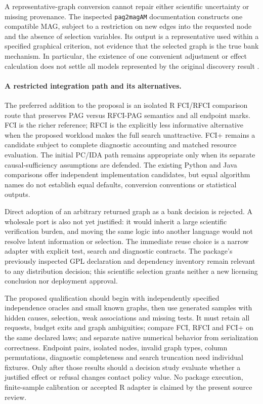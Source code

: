 A representative-graph conversion cannot repair either scientific uncertainty
or missing provenance. The inspected \texttt{pag2magAM} documentation
constructs one compatible MAG, subject to a restriction on new edges into
the requested node and the absence of selection variables. Its output is a
representative used within a specified graphical criterion, not evidence
that the selected graph is the true bank mechanism. In particular, the
existence of one convenient adjustment or effect calculation does not settle
all models represented by the original discovery result
\citep{exec13_latentr_primary}.

\paragraph{A restricted integration path and its alternatives.}
The preferred addition to the proposal is an isolated R FCI/RFCI comparison
route that preserves PAG versus RFCI-PAG semantics and all endpoint marks.
FCI is the richer reference; RFCI is the explicitly less informative
alternative when the proposed workload makes the full search unattractive.
FCI+ remains a candidate subject to complete diagnostic accounting and
matched resource evaluation. The initial PC/IDA path remains appropriate
only when its separate causal-sufficiency assumptions are defended. The
existing Python and Java comparisons offer independent implementation
candidates, but equal algorithm names do not establish equal defaults,
conversion conventions or statistical outputs.

Direct adoption of an arbitrary returned graph as a bank decision is rejected.
A wholesale port is also not yet justified: it would inherit a large
scientific verification burden, and moving the same logic into another
language would not resolve latent information or selection. The immediate
reuse choice is a narrow adapter with explicit test, search and diagnostic
contracts. The package's previously inspected GPL declaration and dependency
inventory remain relevant to any distribution decision; this scientific
selection grants neither a new licensing conclusion nor deployment approval.

The proposed qualification should begin with independently specified
independence oracles and small known graphs, then use generated samples with
hidden causes, selection, weak associations and missing tests. It must retain
all requests, budget exits and graph ambiguities; compare FCI, RFCI and FCI+
on the same declared laws; and separate native numerical behavior from
serialization correctness. Endpoint pairs, isolated nodes, invalid graph
types, column permutations, diagnostic completeness and search truncation
need individual fixtures. Only after those results should a decision study
evaluate whether a justified effect or refusal changes contact policy value.
No package execution, finite-sample calibration or accepted R adapter is
claimed by the present source review.
\label{exec13:latent-r-end}
